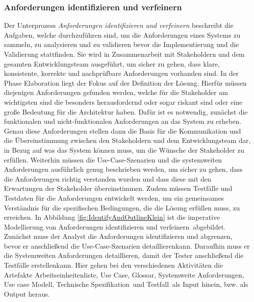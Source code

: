 \subsubsection{Anforderungen identifizieren und verfeinern}
 Der Unterprozess \textit{Anforderungen identifizieren und verfeinern} beschreibt die Aufgaben, welche durchzuführen sind, um die Anforderungen eines Systems zu sammeln, zu analysieren und zu validieren bevor die Implementierung und die Validierung stattfinden. Sie wird in Zusammenarbeit mit Stakeholdern und dem gesamten Entwicklungsteam ausgeführt, um sicher zu gehen, dass klare, konsistente, korrekte und nachprüfbare Anforderungen vorhanden sind.\newline
 In der Phase Elaboration liegt der Fokus auf der Definition der Lösung. Hierfür müssen diejenigen Anforderungen gefunden werden, welche für die Stakeholder am wichtigsten sind die besonders herausfordernd oder sogar riskant sind oder eine große Bedeutung für die Architektur haben.\newline
 Dafür ist es notwendig, zunächst die funktionalen und nicht-funktionalen Anforderungen an das System zu erheben. Genau diese Anforderungen stellen dann die Basis für die Kommunikation und die Übereinstimmung zwischen den Stakeholdern und dem Entwicklungsteam dar, in Bezug auf was das System können muss, um die Wünsche der Stakeholder zu erfüllen.\newline
 Weiterhin müssen die Use-Case-Szenarien und die systemweiten Anforderungen ausführlich genug beschrieben werden, um sicher zu gehen, dass die Anforderungen richtig verstanden wurden und dass diese mit den Erwartungen der Stakeholder übereinstimmen.\newline
 Zudem müssen Testfälle und Testdaten für die Anforderungen entwickelt werden, um ein gemeinsames Verständnis für die spezifischen Bedingungen, die die Lösung erfüllen muss, zu erreichen.
 In Abbildung \ref{fig:IdentifyAndOutlineKlein} ist die imperative Modellierung von \grqq Anforderungen identifizieren und verfeinern\grqq \ abgebildet. \newline
 Zunächst muss der Analyst die \grqq Anforderungen identifizieren und abgrenzen\grqq, bevor er anschließend die \grqq Use-Case-Szenarien detaillieren\grqq kann. Daraufhin muss er die \grqq Systemweiten Anforderungen detaillieren\grqq, damit der Tester anschließend die \grqq Testfälle erstellen\grqq kann.\newline
 Hier gehen bei den verschiedenen Aktivitäten die Artefakte \grqq Arbeitseinheitenliste\grqq, \grqq Use Case\grqq, \grqq Glossar\grqq, \grqq Systemweite Anforderungen\grqq, \grqq Use case Modell\grqq, \grqq Technische Spezifikation\grqq \ und \grqq Testfall\grqq \ als Input hinein, bzw. als Output heraus.
 
